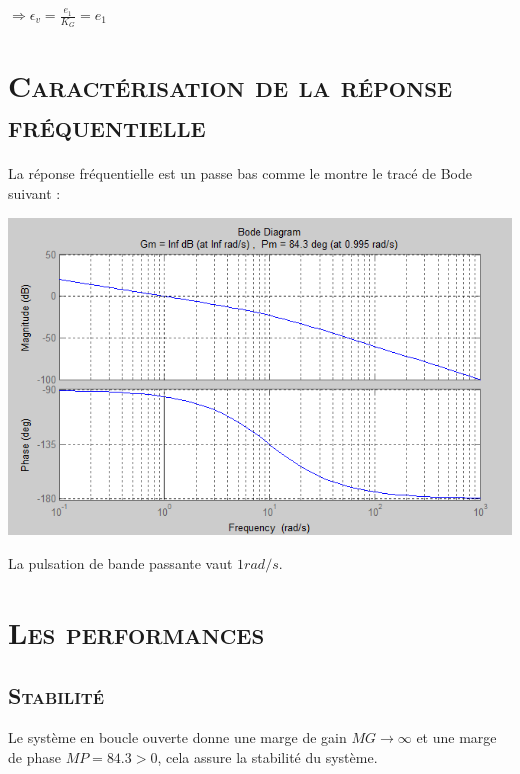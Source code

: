 	$\Rightarrow \epsilon_v = \frac{e_1}{K_G}=e_1$	   
	   
\section{\textsc{Caractérisation de la réponse fréquentielle}}

	\paragraph{} La réponse fréquentielle est un passe bas comme le montre le tracé de Bode suivant : 
	
	\begin{center}
	\includegraphics[scale=0.5]{bode1.png}
	\label{fig3} 
	\end{center}
	
	\par La pulsation de bande passante vaut $1 rad/s.$ \\ 
	
\section{\textsc{Les performances}}
\subsection{\textsc{Stabilité}}

	\par Le système en boucle ouverte donne une marge de gain $MG\rightarrow \infty$ et une marge de phase $MP=84.3>0$, cela assure la stabilité du système. 

